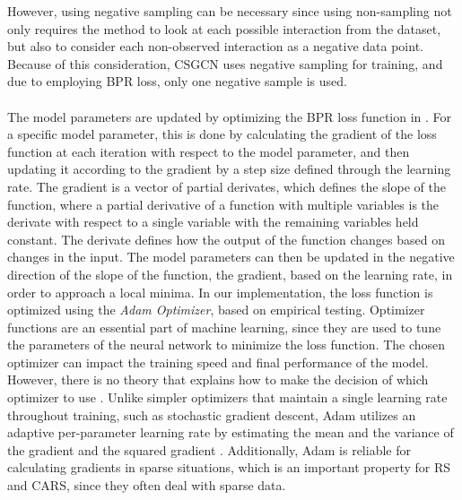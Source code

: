 However, using negative sampling can be necessary since using non-sampling not only requires the method to look at each possible interaction from the dataset, but also to consider each non-observed interaction as a negative data point.
Because of this consideration, CSGCN uses negative sampling for training, and due to employing BPR loss, only one negative sample is used.
\\\\
The model parameters are updated by optimizing the BPR loss function in .
For a specific model parameter, this is done by calculating the gradient of the loss function at each iteration with respect to the model parameter, and then updating it according to the gradient by a step size defined through the learning rate.
The gradient is a vector of partial derivates, which defines the slope of the function, where a partial derivative of a function with multiple variables is the derivate with respect to a single variable with the remaining variables held constant.
The derivate defines how the output of the function changes based on changes in the input.
The model parameters can then be updated in the negative direction of the slope of the function, the gradient, based on the learning rate, in order to approach a local minima. 
In our implementation, the loss function is optimized using the \textit{Adam Optimizer}\cite{AdamOptimizer}, based on empirical testing.
Optimizer functions are an essential part of machine learning, since they are used to tune the parameters of the neural network to minimize the loss function.
The chosen optimizer can impact the training speed and final performance of the model.
However, there is no theory that explains how to make the decision of which optimizer to use \cite{EmpiricalOptimizers}.
Unlike simpler optimizers that maintain a single learning rate throughout training, such as stochastic gradient descent, Adam utilizes an adaptive per-parameter learning rate by estimating the mean and the variance of the gradient and the squared gradient \cite{AdamOptimizer}.
Additionally, Adam is reliable for calculating gradients in sparse situations, which is an important property for RS and CARS, since they often deal with sparse data.



